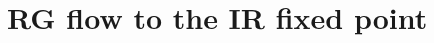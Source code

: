 \documentclass[aps,prb,preprint,groupedaddress]{revtex4-2}
\begin{document}
\section{RG flow to the IR fixed point}\label{fixedPointKondo}
\par\noindent

\end{document}
